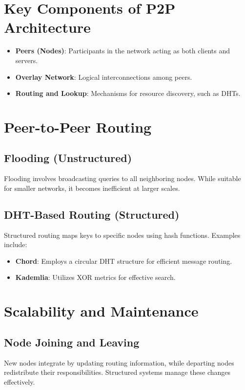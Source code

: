 \documentclass[10pt]{article}
\begin{document}
\section{Key Components of P2P Architecture}
\begin{itemize}
    \item \textbf{Peers (Nodes)}: Participants in the network acting as both clients and servers.
    \item \textbf{Overlay Network}: Logical interconnections among peers.
    \item \textbf{Routing and Lookup}: Mechanisms for resource discovery, such as DHTs.
\end{itemize}

\section{Peer-to-Peer Routing}

\subsection{Flooding (Unstructured)}
Flooding involves broadcasting queries to all neighboring nodes. While suitable for smaller networks, it becomes inefficient at larger scales.

\subsection{DHT-Based Routing (Structured)}
Structured routing maps keys to specific nodes using hash functions. Examples include:
\begin{itemize}
    \item \textbf{Chord}: Employs a circular DHT structure for efficient message routing.
    \item \textbf{Kademlia}: Utilizes XOR metrics for effective search.
\end{itemize}

\section{Scalability and Maintenance}

\subsection{Node Joining and Leaving}
New nodes integrate by updating routing information, while departing nodes redistribute their responsibilities. Structured systems manage these changes effectively.
\end{document}
